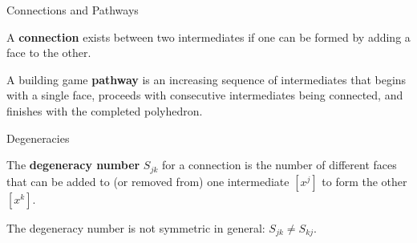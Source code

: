 \documentclass{beamer}
\begin{document}
\begin{frame}{Connections and Pathways}
\begin{definition}
A \textbf{connection} exists between two intermediates if one can be formed by adding a face to the other.
\end{definition}
\begin{definition}
A building game \textbf{pathway} is an increasing sequence of intermediates that begins with a single face, proceeds with consecutive intermediates being connected, and finishes with the completed polyhedron.
\end{definition}

\end{frame}
\begin{frame}{Degeneracies}
\begin{definition}
The \textbf{degeneracy number} $S_{jk}$ for a connection is the number of different faces that can be added to (or removed from) one intermediate $[x^j]$ to form the other $[x^k]$.    
\end{definition}
The degeneracy number is not symmetric in general: $S_{jk} \neq S_{kj}$.

\centering
\end{frame}
\end{document}

